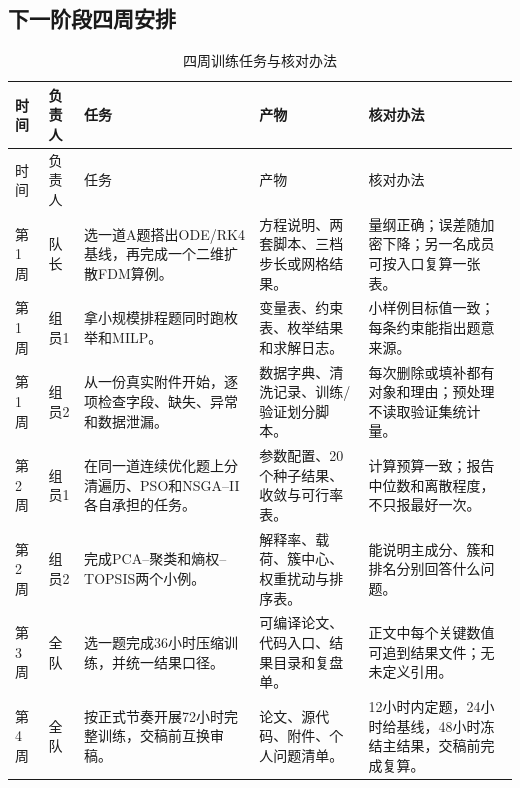 \subsection{下一阶段四周安排}

\small
\begin{longtable}{p{1.3cm}p{1.3cm}p{3.9cm}p{4.7cm}p{4.15cm}}
\caption{四周训练任务与核对办法}\label{tab:four-week-plan}\\
\toprule
时间 & 负责人 & 任务 & 产物 & 核对办法\\
\midrule
\endfirsthead
\toprule
时间 & 负责人 & 任务 & 产物 & 核对办法\\
\midrule
\endhead
\bottomrule
\endfoot
第1周 & 队长 & 选一道A题搭出ODE/RK4基线，再完成一个二维扩散FDM算例。
& 方程说明、两套脚本、三档步长或网格结果。 & 量纲正确；误差随加密下降；另一名成员可按入口复算一张表。\\
第1周 & 组员1 & 拿小规模排程题同时跑枚举和MILP。 & 变量表、约束表、枚举结果和求解日志。 & 小样例目标值一致；每条约束能指出题意来源。\\
第1周 & 组员2 & 从一份真实附件开始，逐项检查字段、缺失、异常和数据泄漏。 & 数据字典、清洗记录、训练/验证划分脚本。 & 每次删除或填补都有对象和理由；预处理不读取验证集统计量。\\
第2周 & 组员1 & 在同一道连续优化题上分清遍历、PSO和NSGA--II各自承担的任务。 & 参数配置、20个种子结果、收敛与可行率表。 & 计算预算一致；报告中位数和离散程度，不只报最好一次。\\
第2周 & 组员2 & 完成PCA--聚类和熵权--TOPSIS两个小例。 & 解释率、载荷、簇中心、权重扰动与排序表。 & 能说明主成分、簇和排名分别回答什么问题。\\
第3周 & 全队 & 选一题完成36小时压缩训练，并统一结果口径。 & 可编译论文、代码入口、结果目录和复盘单。 & 正文中每个关键数值可追到结果文件；无未定义引用。\\
第4周 & 全队 & 按正式节奏开展72小时完整训练，交稿前互换审稿。 & 论文、源代码、附件、个人问题清单。 & 12小时内定题，24小时给基线，48小时冻结主结果，交稿前完成复算。\\
\end{longtable}
\normalsize

